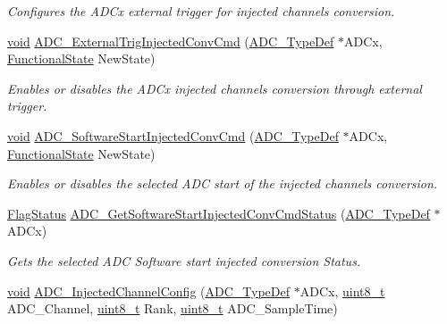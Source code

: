 \begin{DoxyCompactItemize}
\begin{DoxyCompactList}\small\item\em Configures the A\+D\+Cx external trigger for injected channels conversion. \end{DoxyCompactList}\item 
\hyperlink{usb__devapi_8h_afabf60e7f57651d6d595a02c75f07cd0}{void} \hyperlink{group___a_d_c___private___functions_gad81d134c083d8f407c819e6f4722d553}{A\+D\+C\+\_\+\+External\+Trig\+Injected\+Conv\+Cmd} (\hyperlink{struct_a_d_c___type_def}{A\+D\+C\+\_\+\+Type\+Def} $\ast$A\+D\+Cx, \hyperlink{agilefox_2library_2inc_2stm32f10x__type_8h_ac9a7e9a35d2513ec15c3b537aaa4fba1}{Functional\+State} New\+State)
\begin{DoxyCompactList}\small\item\em Enables or disables the A\+D\+Cx injected channels conversion through external trigger. \end{DoxyCompactList}\item 
\hyperlink{usb__devapi_8h_afabf60e7f57651d6d595a02c75f07cd0}{void} \hyperlink{group___a_d_c___private___functions_ga5b141d5dbf5f417a11dfa622c8c149d3}{A\+D\+C\+\_\+\+Software\+Start\+Injected\+Conv\+Cmd} (\hyperlink{struct_a_d_c___type_def}{A\+D\+C\+\_\+\+Type\+Def} $\ast$A\+D\+Cx, \hyperlink{agilefox_2library_2inc_2stm32f10x__type_8h_ac9a7e9a35d2513ec15c3b537aaa4fba1}{Functional\+State} New\+State)
\begin{DoxyCompactList}\small\item\em Enables or disables the selected A\+DC start of the injected channels conversion. \end{DoxyCompactList}\item 
\hyperlink{agilefox_2library_2inc_2stm32f10x__type_8h_a89136caac2e14c55151f527ac02daaff}{Flag\+Status} \hyperlink{group___a_d_c___private___functions_ga8765f8835b8cfed13dce3d8d71767dcc}{A\+D\+C\+\_\+\+Get\+Software\+Start\+Injected\+Conv\+Cmd\+Status} (\hyperlink{struct_a_d_c___type_def}{A\+D\+C\+\_\+\+Type\+Def} $\ast$A\+D\+Cx)
\begin{DoxyCompactList}\small\item\em Gets the selected A\+DC Software start injected conversion Status. \end{DoxyCompactList}\item 
\hyperlink{usb__devapi_8h_afabf60e7f57651d6d595a02c75f07cd0}{void} \hyperlink{group___a_d_c___private___functions_gae2b44bff080184e1cf6f2cb6b9bb3e59}{A\+D\+C\+\_\+\+Injected\+Channel\+Config} (\hyperlink{struct_a_d_c___type_def}{A\+D\+C\+\_\+\+Type\+Def} $\ast$A\+D\+Cx, \hyperlink{_p_e___types_8h_aba7bc1797add20fe3efdf37ced1182c5}{uint8\+\_\+t} A\+D\+C\+\_\+\+Channel, \hyperlink{_p_e___types_8h_aba7bc1797add20fe3efdf37ced1182c5}{uint8\+\_\+t} Rank, \hyperlink{_p_e___types_8h_aba7bc1797add20fe3efdf37ced1182c5}{uint8\+\_\+t} A\+D\+C\+\_\+\+Sample\+Time)

\end{DoxyCompactItemize}

